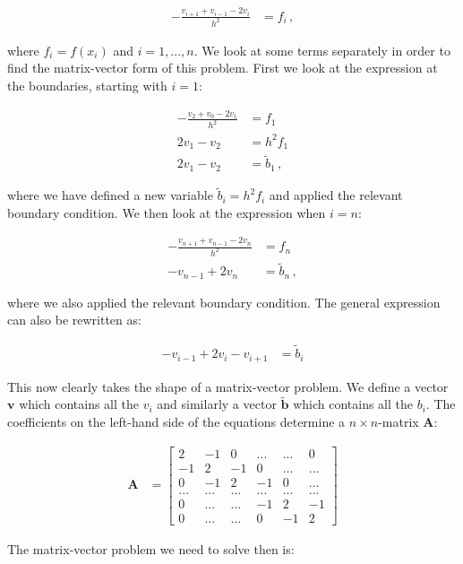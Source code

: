 \documentclass[english,notitlepage,reprint]{revtex4-1}  %
\begin{document}
\begin{align*}
- \frac{v_{i+1} + v_{i-1} - 2v_i}{h^2} &= f_i \, ,
\end{align*}

where $f_i = f(x_i)$ and $i = 1,...,n$. We look at some terms separately in order to find the matrix-vector form of this problem. First we look at the expression at the boundaries, starting with $i=1$:

\begin{align*}
-\frac{v_2 + v_0 - 2v_1}{h^2} &= f_1 \\
2v_1 - v_2 &= h^2 f_1 \\
2v_1 - v_2 &= \tilde{b}_1 \, ,
\end{align*}

where we have defined a new variable $\tilde{b}_i = h^2 f_i$ and applied the relevant boundary condition. We then look at the expression when $i=n$:

\begin{align*}
-\frac{v_{n+1} + v_{n-1} - 2v_{n}}{h^2} &= f_n \\
-v_{n-1} + 2v_n &= \tilde{b}_n \, ,
\end{align*}

where we also applied the relevant boundary condition. The general expression can also be rewritten as:

\begin{align*}
-v_{i-1} + 2v_i - v_{i+1} &= \tilde{b}_i
\end{align*}

This now clearly takes the shape of a matrix-vector problem. We define a vector $\textbf{v}$ which contains all the $v_i$ and similarly a vector $\tilde{\textbf{b}}$ which contains all the $b_i$. The coefficients on the left-hand side of the equations determine a $n\times n$-matrix \textbf{A}:

\begin{align*}
\textbf{A} &= \begin{bmatrix}
2 & -1 & 0 & ... & ... & 0 \\
-1 & 2 & -1 & 0 & ... & ... \\
0 & -1 & 2 & -1 & 0 & ... \\
... & ... & ... & ... & ... & ... \\
0 & ... & ... & -1 & 2 & -1 \\
0 & ... & ... & 0 & -1 & 2 
\end{bmatrix}
\end{align*}

The matrix-vector problem we need to solve then is:
\end{document}
